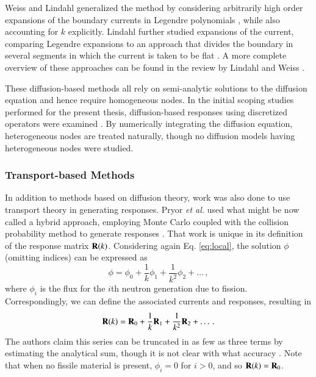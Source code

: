 Weiss and Lindahl generalized the method by considering
arbitrarily high order expansions of the boundary
currents in Legendre polynomials \cite{weiss1975hor}, while also accounting 
for $k$ explicitly.
Lindahl further studied expansions of the current,
comparing Legendre expansions to an approach that
divides the boundary in several segments in which
the current is taken to be flat \cite{lindahl1976mdr}.  A more
complete overview of these approaches can be found
in the review by Lindahl
and Weiss \cite{lindahl1981rrm}.

These diffusion-based methods all rely on semi-analytic solutions to the 
diffusion equation and hence require homogeneous nodes. In the initial 
scoping studies performed for the present thesis, diffusion-based 
responses using discretized operators were examined \cite{roberts2011ser}.  
By numerically integrating the diffusion equation, heterogeneous nodes 
are treated naturally, though no diffusion models having heterogeneous nodes 
were studied.

\subsubsection{Transport-based Methods}

In addition to methods based on diffusion 
theory, work was also done to use transport theory
in generating responses.  Pryor {\it et al.} used
what might be now called a hybrid approach, employing
Monte Carlo coupled with the collision probability 
method to generate responses \cite{pryor1973rmm, pryor1975rdr,
sicilian1975atr}.  That work is unique in its definition
of the response matrix $\mathbf{R}(k)$.  Considering again
 Eq. \ref{eq:local}, the solution $\phi$ (omitting 
indices) can
be expressed as
\begin{equation}
 \phi = \phi_{0} + \frac{1}{k}\phi_{1}
                 + \frac{1}{k^2}\phi_{2}  + \ldots \, ,
\end{equation}
where $\phi_{i} $ is the flux for the $i$th neutron
generation due to fission.  Correspondingly, we
can define the associated currents and responses, 
resulting in 
\begin{equation}
 \mathbf{R}(k) = \mathbf{R}_0 + \frac{1}{k}\mathbf{R}_1
                 + \frac{1}{k^2}\mathbf{R}_2  + \ldots \, .
\label{eq:responsesum}
\end{equation}
The authors claim this series can be truncated in
as few as three terms by estimating the analytical
sum, though it is not clear with what accuracy
 \cite{sicilian1975atr}.  Note that when
 no fissile material
is present, $\phi_{i} = 0$ for $i > 0$, and so
$\mathbf{R}(k) = \mathbf{R}_0$.



